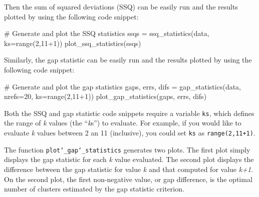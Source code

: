 \documentclass[paper=a4, fontsize=11pt]{scrartcl} %
\numberwithin{equation}{section} %
\numberwithin{figure}{section} %
\numberwithin{table}{section} %
\begin{document}
\vspace{6pt}

Then the sum of squared deviations (SSQ) can be easily run and the results plotted by using the following code snippet:

\vspace{6pt}

\begin{adjustbox}{minipage=0.8\textwidth,margin=0pt \smallskipamount,center}
\begin{python}
# Generate and plot the SSQ statistics
ssqs = ssq_statistics(data, ks=range(2,11+1))
plot_ssq_statistics(ssqs)
\end{python}
\end{adjustbox}

\vspace{6pt}

Similarly, the gap statistic can be easily run and the results plotted by using the following code snippet:

\vspace{6pt}

\begin{adjustbox}{minipage=0.8\textwidth,margin=0pt \smallskipamount,center}
\begin{python}
# Generate and plot the gap statistics
gaps, errs, difs = gap_statistics(data, nrefs=20, ks=range(2,11+1))
plot_gap_statistics(gaps, errs, difs)
\end{python}
\end{adjustbox}

\vspace{6pt}

Both the SSQ and gap statistic code snippets require a variable \texttt{ks}, which defines the range of \textit{k} values (the ``\textit{k}s'') to evaluate. For example, if you would like to evaluate \textit{k} values between 2 an 11 (inclusive), you could set \texttt{ks} as \texttt{range(2,11+1)}.

\vspace{6pt}

The function \texttt{plot\char`_gap\char`_statistics} generates two plots. The first plot simply displays the gap statistic for each \textit{k} value evaluated. The second plot displays the difference between the gap statistic for value \textit{k} and that computed for value \textit{k+1}. On the second plot, the first non-negative value, or gap difference, is the optimal number of clusters estimated by the gap statistic criterion.

\vspace{8pt}
\end{document}
